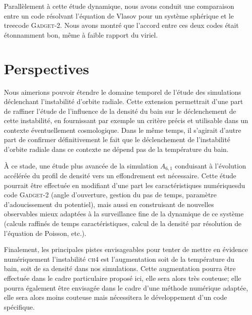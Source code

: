 Parallèlement à cette étude dynamique, nous avons conduit une
comparaison entre un code résolvant l'équation de Vlasov pour un
système sphérique et le treecode \textsc{Gadget-2}. Nous avons montré que
l'accord entre ces deux codes était étonnamment bon, même à
faible rapport du viriel. 


\section{Perspectives}


Nous aimerions pouvoir étendre le domaine temporel de l'étude des
simulations déclenchant l'instabilité d'orbite radiale. Cette
extension permettrait d'une part de raffiner l'étude de l'influence de la
densité du bain sur le déclenchement de cette instabilité, en
fournissant par exemple un critère précis et utilisable dans un
contexte éventuellement cosmologique. Dans le même temps, il s'agirait
d'autre part de confirmer définitivement le fait que le déclenchement
de l'instabilité d'orbite radiale dans ce contexte ne dépend pas de la
température du bain.



À ce stade, une étude plus avancée de la simulation $A_{6,1}$
conduisant à l'évolution accélérée du profil de
densité vers un effondrement est nécessaire.  Cette étude pourrait
être effectuée en modifiant d'une part les caractéristiques
\og{}numériques\fg du code \textsc{Gadget-2} (angle d'ouverture, gestion du pas de temps,
paramètre d'adoucissement du potentiel), mais aussi en construisant de
nouvelles observables mieux adaptées à la surveillance fine de la
dynamique de ce système (calculs raffinés de temps
caractéristiques, calcul de la densité par résolution de
l'équation de Poisson, etc.).


Finalement, les principales pistes envisageables pour tenter de
mettre en évidence numériquement l'instabilité \textsc{ch4}  est
l'augmentation soit de la température du bain, soit de sa densité dans nos simulations. Cette
augmentation pourra être effectuée dans le cadre particulaire
proposé ici, elle sera alors très couteuse; elle pourra également
être envisagée dans le cadre d'une méthode numérique
adaptée, elle sera alors moins couteuse mais nécessitera le
développement d'un code spécifique.

